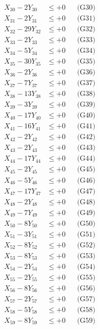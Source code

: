 \documentclass[a4paper,10pt]{article}
\begin{document}
{\begin{align}
\allowbreak
X_{30} - 2Y_{30} &\leq +0 && \text{(G30)} \\
X_{31} - 2Y_{31} &\leq +0 && \text{(G31)} \\
X_{32} - 29Y_{32} &\leq +0 && \text{(G32)} \\
X_{33} - 2Y_{33} &\leq +0 && \text{(G33)} \\
X_{34} - 5Y_{34} &\leq +0 && \text{(G34)} \\
X_{35} - 30Y_{35} &\leq +0 && \text{(G35)} \\
X_{36} - 2Y_{36} &\leq +0 && \text{(G36)} \\
X_{37} - 7Y_{37} &\leq +0 && \text{(G37)} \\
X_{38} - 13Y_{38} &\leq +0 && \text{(G38)} \\
X_{39} - 3Y_{39} &\leq +0 && \text{(G39)} \\
\allowbreak
X_{40} - 17Y_{40} &\leq +0 && \text{(G40)} \\
X_{41} - 16Y_{41} &\leq +0 && \text{(G41)} \\
X_{42} - 2Y_{42} &\leq +0 && \text{(G42)} \\
X_{43} - 2Y_{43} &\leq +0 && \text{(G43)} \\
X_{44} - 17Y_{44} &\leq +0 && \text{(G44)} \\
X_{45} - 2Y_{45} &\leq +0 && \text{(G45)} \\
X_{46} - 5Y_{46} &\leq +0 && \text{(G46)} \\
X_{47} - 17Y_{47} &\leq +0 && \text{(G47)} \\
X_{48} - 2Y_{48} &\leq +0 && \text{(G48)} \\
X_{49} - 7Y_{49} &\leq +0 && \text{(G49)} \\
\allowbreak
X_{50} - 8Y_{50} &\leq +0 && \text{(G50)} \\
X_{51} - 3Y_{51} &\leq +0 && \text{(G51)} \\
X_{52} - 8Y_{52} &\leq +0 && \text{(G52)} \\
X_{53} - 8Y_{53} &\leq +0 && \text{(G53)} \\
X_{54} - 2Y_{54} &\leq +0 && \text{(G54)} \\
X_{55} - 2Y_{55} &\leq +0 && \text{(G55)} \\
X_{56} - 8Y_{56} &\leq +0 && \text{(G56)} \\
X_{57} - 2Y_{57} &\leq +0 && \text{(G57)} \\
X_{58} - 5Y_{58} &\leq +0 && \text{(G58)} \\
X_{59} - 8Y_{59} &\leq +0 && \text{(G59)} \\
\allowbreak

\end{align}}
\end{document}

